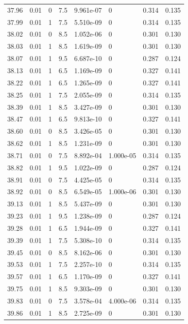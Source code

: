 \documentclass[preview]{standalone}
\begin{document}
{{{{{{{{{{{\begin{tabular}{L{1.2cm}C{1.2cm} C{0.3cm}C{0.5cm} C{1.4cm}C{1.4cm} C{1.4cm}C{1.4cm}}
  37.96  &  0.01  & 0     & 7.5 &  9.961e-07  & 0  & 0.314 &  0.135   \\ 
  37.99  &  0.01  & 1     & 7.5 &  5.510e-09  & 0  & 0.314 &  0.135   \\ 
  38.02  &  0.01  & 0     & 8.5 &  1.052e-06  & 0  & 0.301 &  0.130   \\ 
  38.03  &  0.01  & 1     & 8.5 &  1.619e-09  & 0  & 0.301 &  0.130   \\ 
  38.07  &  0.01  & 1     & 9.5 &  6.687e-10  & 0  & 0.287 &  0.124   \\ 
  38.13  &  0.01  & 1     & 6.5 &  1.169e-09  & 0  & 0.327 &  0.141   \\ 
  38.22  &  0.01  & 1     & 6.5 &  1.265e-09  & 0  & 0.327 &  0.141   \\ 
  38.25  &  0.01  & 1     & 7.5 &  2.055e-09  & 0  & 0.314 &  0.135   \\ 
  38.39  &  0.01  & 1     & 8.5 &  3.427e-09  & 0  & 0.301 &  0.130   \\ 
  38.47  &  0.01  & 1     & 6.5 &  9.813e-10  & 0  & 0.327 &  0.141   \\ 
  38.60  &  0.01  & 0     & 8.5 &  3.426e-05  & 0  & 0.301 &  0.130   \\ 
  38.62  &  0.01  & 1     & 8.5 &  1.231e-09  & 0  & 0.301 &  0.130   \\ 
  38.71  &  0.01  & 0     & 7.5 &  8.892e-04  & 1.000e-05  & 0.314 &  0.135   \\ 
  38.82  &  0.01  & 1     & 9.5 &  1.022e-09  & 0  & 0.287 &  0.124   \\ 
  38.91  &  0.01  & 0     & 7.5 &  4.425e-05  & 0  & 0.314 &  0.135   \\ 
  38.92  &  0.01  & 0     & 8.5 &  6.549e-05  & 1.000e-06  & 0.301 &  0.130   \\ 
  39.13  &  0.01  & 1     & 8.5 &  5.437e-09  & 0  & 0.301 &  0.130   \\ 
  39.23  &  0.01  & 1     & 9.5 &  1.238e-09  & 0  & 0.287 &  0.124   \\ 
  39.28  &  0.01  & 1     & 6.5 &  1.944e-09  & 0  & 0.327 &  0.141   \\ 
  39.39  &  0.01  & 1     & 7.5 &  5.308e-10  & 0  & 0.314 &  0.135   \\ 
  39.45  &  0.01  & 0     & 8.5 &  8.162e-06  & 0  & 0.301 &  0.130   \\ 
  39.53  &  0.01  & 1     & 7.5 &  2.257e-10  & 0  & 0.314 &  0.135   \\ 
  39.57  &  0.01  & 1     & 6.5 &  1.170e-09  & 0  & 0.327 &  0.141   \\ 
  39.75  &  0.01  & 1     & 8.5 &  9.303e-09  & 0  & 0.301 &  0.130   \\ 
  39.83  &  0.01  & 0     & 7.5 &  3.578e-04  & 4.000e-06  & 0.314 &  0.135   \\ 
  39.86  &  0.01  & 1     & 8.5 &  2.725e-09  & 0  & 0.301 &  0.130   \\ 
\hline 
\end{tabular} 

}}}}}}}}}}}
\end{document}
